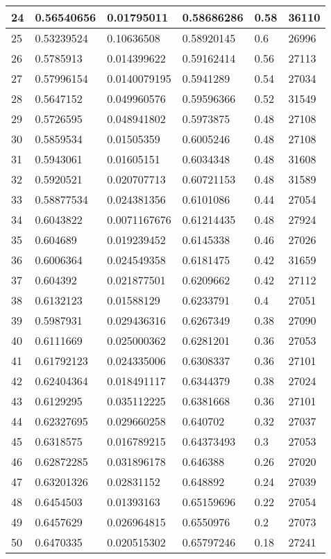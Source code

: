 \begin{longtable}{|l|l|l|l|l|l|}
24 & 0.56540656 & 0.01795011 & 0.58686286 & 0.58 & 36110 \\ \hline 
25 & 0.53239524 & 0.10636508 & 0.58920145 & 0.6 & 26996 \\ \hline 
26 & 0.5785913 & 0.014399622 & 0.59162414 & 0.56 & 27113 \\ \hline 
27 & 0.57996154 & 0.0140079195 & 0.5941289 & 0.54 & 27034 \\ \hline 
28 & 0.5647152 & 0.049960576 & 0.59596366 & 0.52 & 31549 \\ \hline 
29 & 0.5726595 & 0.048941802 & 0.5973875 & 0.48 & 27108 \\ \hline 
30 & 0.5859534 & 0.01505359 & 0.6005246 & 0.48 & 27108 \\ \hline 
31 & 0.5943061 & 0.01605151 & 0.6034348 & 0.48 & 31608 \\ \hline 
32 & 0.5920521 & 0.020707713 & 0.60721153 & 0.48 & 31589 \\ \hline 
33 & 0.58877534 & 0.024381356 & 0.6101086 & 0.44 & 27054 \\ \hline 
34 & 0.6043822 & 0.0071167676 & 0.61214435 & 0.48 & 27924 \\ \hline 
35 & 0.604689 & 0.019239452 & 0.6145338 & 0.46 & 27026 \\ \hline 
36 & 0.6006364 & 0.024549358 & 0.6181475 & 0.42 & 31659 \\ \hline 
37 & 0.604392 & 0.021877501 & 0.6209662 & 0.42 & 27112 \\ \hline 
38 & 0.6132123 & 0.01588129 & 0.6233791 & 0.4 & 27051 \\ \hline 
39 & 0.5987931 & 0.029436316 & 0.6267349 & 0.38 & 27090 \\ \hline 
40 & 0.6111669 & 0.025000362 & 0.6281201 & 0.36 & 27053 \\ \hline 
41 & 0.61792123 & 0.024335006 & 0.6308337 & 0.36 & 27101 \\ \hline 
42 & 0.62404364 & 0.018491117 & 0.6344379 & 0.38 & 27024 \\ \hline 
43 & 0.6129295 & 0.035112225 & 0.6381668 & 0.36 & 27101 \\ \hline 
44 & 0.62327695 & 0.029660258 & 0.640702 & 0.32 & 27037 \\ \hline 
45 & 0.6318575 & 0.016789215 & 0.64373493 & 0.3 & 27053 \\ \hline 
46 & 0.62872285 & 0.031896178 & 0.646388 & 0.26 & 27020 \\ \hline 
47 & 0.63201326 & 0.02831152 & 0.648892 & 0.24 & 27039 \\ \hline 
48 & 0.6454503 & 0.01393163 & 0.65159696 & 0.22 & 27054 \\ \hline 
49 & 0.6457629 & 0.026964815 & 0.6550976 & 0.2 & 27073 \\ \hline 
50 & 0.6470335 & 0.020515302 & 0.65797246 & 0.18 & 27241 \\ \hline 
\end{longtable}